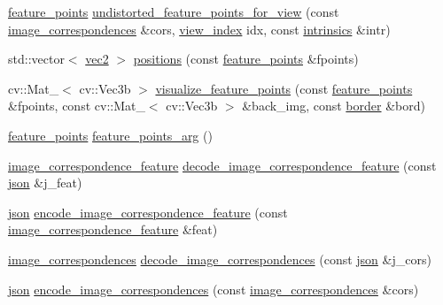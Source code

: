 \begin{DoxyCompactItemize}
\item 
\hyperlink{structtlz_1_1feature__points}{feature\+\_\+points} \hyperlink{namespacetlz_aff19d91ea9462be84d8e7db9015686bf}{undistorted\+\_\+feature\+\_\+points\+\_\+for\+\_\+view} (const \hyperlink{structtlz_1_1image__correspondences}{image\+\_\+correspondences} \&cors, \hyperlink{structtlz_1_1view__index}{view\+\_\+index} idx, const \hyperlink{structtlz_1_1intrinsics}{intrinsics} \&intr)
\item 
std\+::vector$<$ \hyperlink{namespacetlz_ae192989bfbe6c700ac84d2a8cf05ebb4}{vec2} $>$ \hyperlink{namespacetlz_a2d22b0db00d90ecf5eb79fd0a5b7bcf9}{positions} (const \hyperlink{structtlz_1_1feature__points}{feature\+\_\+points} \&fpoints)
\item 
cv\+::\+Mat\+\_\+$<$ cv\+::\+Vec3b $>$ \hyperlink{namespacetlz_a4f0806fc3ebaf4a594e02c8a01792197}{visualize\+\_\+feature\+\_\+points} (const \hyperlink{structtlz_1_1feature__points}{feature\+\_\+points} \&fpoints, const cv\+::\+Mat\+\_\+$<$ cv\+::\+Vec3b $>$ \&back\+\_\+img, const \hyperlink{structtlz_1_1border}{border} \&bord)
\item 
\hyperlink{structtlz_1_1feature__points}{feature\+\_\+points} \hyperlink{namespacetlz_accab66b2847b4c4ea3170487b64903c1}{feature\+\_\+points\+\_\+arg} ()
\item 
\hyperlink{structtlz_1_1image__correspondence__feature}{image\+\_\+correspondence\+\_\+feature} \hyperlink{namespacetlz_ab83b0eb933afca1abe8ccd3470207691}{decode\+\_\+image\+\_\+correspondence\+\_\+feature} (const \hyperlink{namespacetlz_ac400657dfcddf6309a769aefc23eed0c}{json} \&j\+\_\+feat)
\item 
\hyperlink{namespacetlz_ac400657dfcddf6309a769aefc23eed0c}{json} \hyperlink{namespacetlz_aa875dcb2a47f0a406887a14c6f515bfd}{encode\+\_\+image\+\_\+correspondence\+\_\+feature} (const \hyperlink{structtlz_1_1image__correspondence__feature}{image\+\_\+correspondence\+\_\+feature} \&feat)
\item 
\hyperlink{structtlz_1_1image__correspondences}{image\+\_\+correspondences} \hyperlink{namespacetlz_a24915249769d936c24ceb34f50b06104}{decode\+\_\+image\+\_\+correspondences} (const \hyperlink{namespacetlz_ac400657dfcddf6309a769aefc23eed0c}{json} \&j\+\_\+cors)
\item 
\hyperlink{namespacetlz_ac400657dfcddf6309a769aefc23eed0c}{json} \hyperlink{namespacetlz_a5425610b090d56218f8a7272ba402bfb}{encode\+\_\+image\+\_\+correspondences} (const \hyperlink{structtlz_1_1image__correspondences}{image\+\_\+correspondences} \&cors)
\item 

\end{DoxyCompactItemize}
